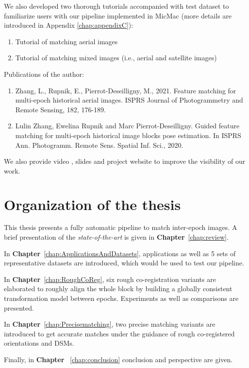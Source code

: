 \par
We also developed two thorough tutorials accompanied with test dataset to familiarize users with our pipeline implemented in MicMac\cite{HistoPcode} (more details are introduced in Appendix \ref{chap:appendixC}):
\begin{enumerate}
	\item Tutorial of matching aerial images \cite{tuto-aerial} %
	\item Tutorial of matching mixed images (i.e., aerial and satellite images) \cite{tuto-mixed} %
\end{enumerate}

\par
Publications of the author:
\begin{enumerate}
	\item Zhang, L., Rupnik, E., Pierrot-Deseilligny, M., 2021. Feature matching for multi-epoch historical aerial images. ISPRS Journal of Photogrammetry and Remote Sensing, 182, 176-189.
	\item Lulin Zhang, Ewelina Rupnik and Marc Pierrot-Deseilligny.	Guided feature matching for multi-epoch historical image blocks pose estimation. In ISPRS Ann. Photogramm. Remote Sens. Spatial Inf. Sci., 2020.
\end{enumerate}
We also provide video \cite{HistoPVideo}, slides \cite{HistoPSlides} and project website \cite{HistoPProj} to improve the visibility of our work.

\section{Organization of the thesis}
This thesis presents a fully automatic pipeline to match inter-epoch images. %
A brief presentation of the \textit{state-of-the-art} is given in \textbf{Chapter}~\ref{chap:review}. 

In \textbf{Chapter}~\ref{chap:ApplicationsAndDatasets}, applications as well as 5 sets of representative datasets are introduced, which would be used to test our pipeline.

In \textbf{Chapter}~\ref{chap:RoughCoReg}, six rough co-registration variants are elaborated to roughly align the whole block by building a globally consistent transformation model between epochs.
Experiments as well as comparisons are presented.

In \textbf{Chapter}~\ref{chap:Precisematching}, two precise matching variants are introduced to get accurate matches under the guidance of rough co-registered orientations and \ac{DSM}s.

Finally, in \textbf{Chapter} ~\ref{chap:conclusion} conclusion and perspective are given.

